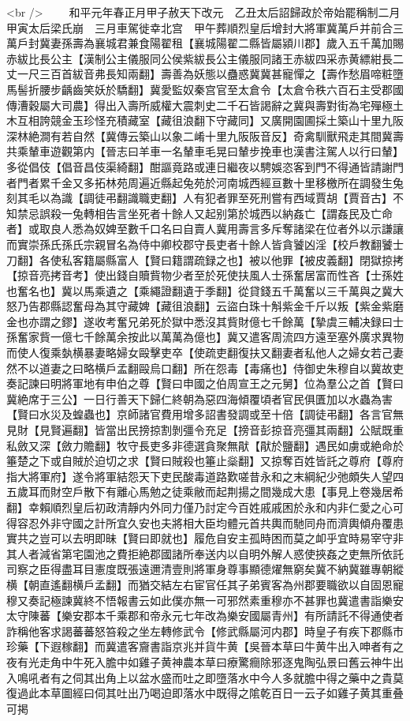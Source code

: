 <br />
　　和平元年春正月甲子赦天下改元　乙丑太后詔歸政於帝始罷稱制二月甲寅太后梁氏崩　三月車駕徙幸北宫　甲午葬順烈皇后增封大將軍冀萬戶并前合三萬戶封冀妻孫壽為襄城君兼食陽翟租【襄城陽翟二縣皆屬潁川郡】歲入五千萬加賜赤紱比長公主【漢制公主儀服同公侯紫紱長公主儀服同諸王赤紱四采赤黄縹紺長二丈一尺三百首紱音弗長知兩翻】壽善為妖態以蠱惑冀冀甚寵憚之【壽作愁眉啼粧墮馬髻折腰步齲齒笑妖於驕翻】冀愛監奴秦宫官至太倉令【太倉令秩六百石主受郡國傳漕穀屬大司農】得出入壽所威權大震刺史二千石皆謁辭之冀與壽對街為宅殫極土木互相誇競金玉珍怪充積藏室【藏徂浪翻下守藏同】又廣開園圃採土築山十里九阪深林絶澗有若自然【冀傳云築山以象二崤十里九阪阪音反】奇禽馴獸飛走其間冀壽共乘輦車遊觀第内【晉志曰羊車一名輦車毛晃曰輦步挽車也漢書注駕人以行曰輦】多從倡伎【倡音昌伎渠綺翻】酣謳竟路或連日繼夜以騁娛恣客到門不得通皆請謝門者門者累千金又多拓林苑周遍近縣起兔苑於河南城西經亘數十里移檄所在調發生兔刻其毛以為識【調徒弔翻識職吏翻】人有犯者罪至死刑嘗有西域賈胡【賈音古】不知禁忌誤殺一兔轉相告言坐死者十餘人又起别第於城西以納姦亡【謂姦民及亡命者】或取良人悉為奴婢至數千口名曰自賣人冀用壽言多斥奪諸梁在位者外以示謙讓而實崇孫氏孫氏宗親冒名為侍中卿校郡守長吏者十餘人皆貪饕凶淫【校戶教翻饕士刀翻】各使私客籍屬縣富人【賢曰籍謂疏録之也】被以他罪【被皮義翻】閉獄掠拷【掠音亮拷音考】使出錢自贖貲物少者至於死使扶風人士孫奮居富而性吝【士孫姓也奮名也】冀以馬乘遺之【乘繩證翻遺于季翻】從貸錢五千萬奮以三千萬與之冀大怒乃告郡縣認奮母為其守藏婢【藏徂浪翻】云盜白珠十斛紫金千斤以叛【紫金紫磨金也亦謂之鏐】遂收考奮兄弟死於獄中悉沒其貲財億七千餘萬【摯虞三輔决録曰士孫奮家貲一億七千餘萬余按此以萬萬為億也】冀又遣客周流四方遠至塞外廣求異物而使人復乘埶横暴妻略婦女毆擊吏卒【使疏吏翻復扶又翻妻者私他人之婦女若己妻然不以道妻之曰略横戶孟翻毆烏口翻】所在怨毒【毒痛也】侍御史朱穆自以冀故吏奏記諫曰明將軍地有申伯之尊【賢曰申國之伯周宣王之元舅】位為羣公之首【賢曰冀絶席于三公】一日行善天下歸仁終朝為惡四海傾覆頃者官民俱匱加以水蟲為害【賢曰水災及蝗蟲也】京師諸官費用增多詔書發調或至十倍【調徒弔翻】各言官無見財【見賢遍翻】皆當出民搒掠割剝彊令充足【搒音彭掠音亮彊其兩翻】公賦既重私斂又深【斂力贍翻】牧守長吏多非德選貪聚無猒【猒於鹽翻】遇民如虜或絶命於箠楚之下或自賊於迫切之求【賢曰賊殺也箠止橤翻】又掠奪百姓皆託之尊府【尊府指大將軍府】遂令將軍結怨天下吏民酸毒道路歎嗟昔永和之末綱紀少弛頗失人望四五歲耳而財空戶散下有離心馬勉之徒乘敝而起荆揚之間幾成大患【事見上卷幾居希翻】幸賴順烈皇后初政清靜内外同力僅乃討定今百姓戚戚困於永和内非仁愛之心可得容忍外非守國之計所宜久安也夫將相大臣均體元首共輿而馳同舟而濟輿傾舟覆患實共之豈可以去明即昧【賢曰即就也】履危自安主孤時困而莫之卹乎宜時易宰守非其人者減省第宅園池之費拒絶郡國諸所奉送内以自明外解人惑使挾姦之吏無所依託司察之臣得盡耳目憲度既張遠邇清壹則將軍身尊事顯德燿無窮矣冀不納冀雖專朝縱横【朝直遙翻横戶孟翻】而猶交結左右宦官任其子弟賓客為州郡要職欲以自固恩寵穆又奏記極諫冀終不悟報書云如此僕亦無一可邪然素重穆亦不甚罪也冀遣書詣樂安太守陳蕃【樂安郡本千乘郡和帝永元七年改為樂安國屬青州】有所請託不得通使者詐稱他客求謁蕃蕃怒笞殺之坐左轉修武令【修武縣屬河内郡】時皇子有疾下郡縣市珍藥【下遐稼翻】而冀遣客齎書詣京兆并貨牛黄【吳晉本草曰牛黄牛出入呻者有之夜有光走角中牛死入膽中如雞子黄神農本草曰療驚癎除邪逐鬼陶弘景曰舊云神牛出入鳴吼者有之伺其出角上以盆水盛而吐之即墮落水中今人多就膽中得之藥中之貴莫復過此本草圖經曰伺其吐出乃喝迫即落水中既得之隂乾百日一云子如雞子黄其重叠可掲